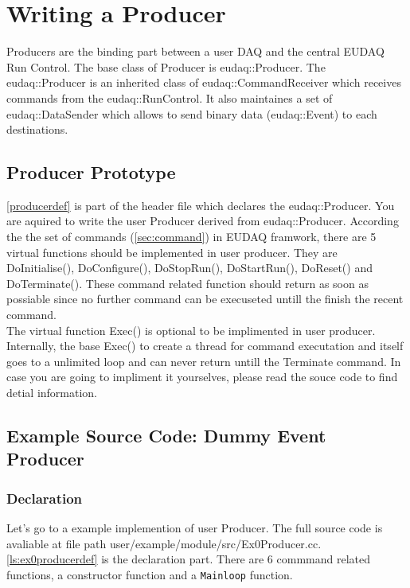\section{Writing a Producer}\label{sec:ProducerWriting}
Producers are the binding part between a user DAQ and the central EUDAQ Run Control. The base class of Producer is eudaq::Producer. The eudaq::Producer is an inherited class of eudaq::CommandReceiver which receives commands from the eudaq::RunControl. It also maintaines a set of eudaq::DataSender which allows to send binary data (eudaq::Event) to each destinations.\\

\subsection{Producer Prototype}\label{sec:Producer_hh}

\autoref{producerdef} is part of the header file which declares the eudaq::Producer. You are aquired to write the user Producer derived from eudaq::Producer. According the the set of commands (\autoref{sec:command}) in EUDAQ framwork, there are 5 virtual functions should be implemented in user producer. They are DoInitialise(), DoConfigure(), DoStopRun(), DoStartRun(), DoReset() and DoTerminate(). These command related function should return as soon as possiable since no further command can be execuseted untill the finish the recent command. \\



The virtual function Exec() is optional to be implimented in user producer. Internally, the base Exec() to create a thread for command executation and itself goes to a unlimited loop and can never return untill the Terminate command. In case you are going to impliment it yourselves, please read the souce code to find detial information.

\subsection{Example Source Code: Dummy Event Producer}\label{sec:Ex0Producer_cc}
\subsubsection{Declaration}
Let's go to a example implemention of user Producer. The full source code is avaliable at file path user/example/module/src/Ex0Producer.cc.  \autoref{ls:ex0producerdef} is the declaration part. There are 6 commmand related functions, a constructor function and a \texttt{Mainloop} function. \\


